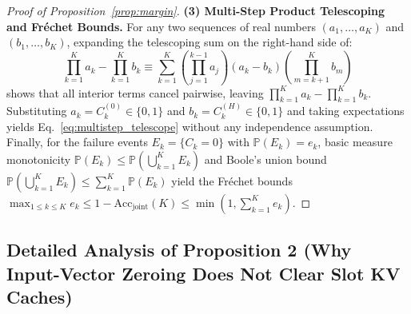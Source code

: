 \begin{proof}[Proof of Proposition~\ref{prop:margin}]
\textbf{(3) Multi-Step Product Telescoping and Fr\'echet Bounds.}
For any two sequences of real numbers $(a_1, \dots, a_K)$ and $(b_1, \dots, b_K)$, expanding the telescoping sum on the right-hand side of:
\begin{equation}
  \prod_{k=1}^K a_k - \prod_{k=1}^K b_k \equiv \sum_{k=1}^K \left(\prod_{j=1}^{k-1} a_j\right) (a_k - b_k) \left(\prod_{m=k+1}^K b_m\right)
\end{equation}
shows that all interior terms cancel pairwise, leaving $\prod_{k=1}^K a_k - \prod_{k=1}^K b_k$. Substituting $a_k = C_k^{(0)} \in \{0, 1\}$ and $b_k = C_k^{(H)} \in \{0, 1\}$ and taking expectations yields Eq.~\eqref{eq:multistep_telescope} without any independence assumption. Finally, for the failure events $E_k = \{C_k = 0\}$ with $\mathbb{P}(E_k) = e_k$, basic measure monotonicity $\mathbb{P}(E_k) \le \mathbb{P}(\bigcup_{k=1}^K E_k)$ and Boole's union bound $\mathbb{P}(\bigcup_{k=1}^K E_k) \le \sum_{k=1}^K \mathbb{P}(E_k)$ yield the Fr\'echet bounds $\max_{1 \le k \le K} e_k \le 1 - \mathrm{Acc}_{\mathrm{joint}}(K) \le \min(1, \sum_{k=1}^K e_k)$.
\end{proof}

\subsection{Detailed Analysis of Proposition 2 (Why Input-Vector Zeroing Does Not Clear Slot KV Caches)}

